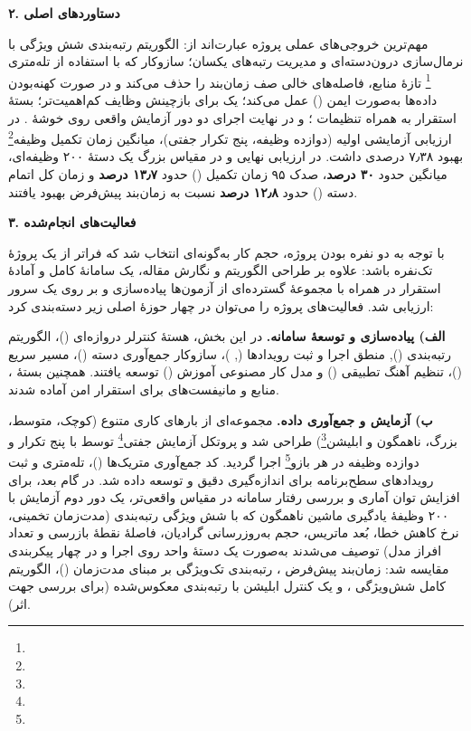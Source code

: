 \documentclass[a4paper,12pt]{article}
\begin{document}
	{\large\textbf{۲. دستاوردهای اصلی}}
	
	مهم‌ترین خروجی‌های عملی پروژه عبارت‌اند از: الگوریتم رتبه‌بندی شش‌ ویژگی با نرمال‌سازی درون‌دسته‌ای و مدیریت رتبه‌های یکسان؛ سازوکار  که با استفاده از تله‌متری \footnote{} تازهٔ منابع، فاصله‌های خالی صف زمان‌بند را حذف می‌کند و در صورت کهنه‌بودن داده‌ها به‌صورت ایمن () عمل می‌کند؛ یک  برای بازچینش وظایف کم‌اهمیت‌تر؛ بستهٔ استقرار  به همراه تنظیمات ؛ و در نهایت اجرای دو دور آزمایش واقعی روی خوشهٔ . در ارزیابی آزمایشی اولیه (دوازده وظیفه، پنج تکرار جفتی)، میانگین زمان تکمیل وظیفه\footnote{} بهبود ۷٫۳۸ درصدی داشت. در ارزیابی نهایی و در مقیاس بزرگ‌ یک دستهٔ ۲۰۰ وظیفه‌ای، میانگین  حدود \textbf{۳۰ درصد}، صدک ۹۵ زمان تکمیل () حدود \textbf{۱۳٫۷ درصد} و زمان کل اتمام دسته () حدود \textbf{۱۲٫۸ درصد} نسبت به زمان‌بند پیش‌فرض  بهبود یافتند.
	
	\vspace{0.2cm}
	
	{\large\textbf{۳. فعالیت‌های انجام‌شده}}
	
	با توجه به دو نفره بودن پروژه، حجم کار به‌گونه‌ای انتخاب شد که فراتر از یک پروژهٔ تک‌نفره باشد: علاوه بر طراحی الگوریتم و نگارش مقاله، یک سامانهٔ کامل و آمادهٔ استقرار در  همراه با مجموعهٔ گسترده‌ای از آزمون‌ها پیاده‌سازی و بر روی یک سرور ارزیابی شد. فعالیت‌های پروژه را می‌توان در چهار حوزهٔ اصلی زیر دسته‌بندی کرد:
	
	\textbf{الف) پیاده‌سازی و توسعهٔ سامانه.}
	در این بخش، هستهٔ کنترلر دروازه‌ای ()، الگوریتم رتبه‌بندی (), منطق اجرا و ثبت رویدادها (, )، سازوکار جمع‌آوری دسته ()، مسیر سریع ()، تنظیم آهنگ تطبیقی () و مدل کار مصنوعی آموزش () توسعه یافتند. همچنین بستهٔ ، منابع  و مانیفست‌های  برای استقرار امن آماده شدند.
	
	\textbf{ب) آزمایش و جمع‌آوری داده.}
	مجموعه‌ای از بارهای کاری متنوع (کوچک، متوسط، بزرگ، ناهمگون و ابلیشن\footnote{}) طراحی شد و پروتکل آزمایش جفتی\footnote{} توسط  با پنج تکرار و دوازده وظیفه در هر بازو\footnote{} اجرا گردید. کد جمع‌آوری متریک‌ها ()، تله‌متری و ثبت رویدادهای سطح‌برنامه برای اندازه‌گیری دقیق  و  توسعه داده شد. در گام بعد، برای افزایش توان آماری و بررسی رفتار سامانه در مقیاس واقعی‌تر، یک دور دوم آزمایش با ۲۰۰ وظیفهٔ یادگیری ماشین ناهمگون که با شش ویژگی رتبه‌بندی (مدت‌زمان تخمینی، نرخ کاهش خطا، بُعد ماتریس، حجم به‌روزرسانی گرادیان، فاصلهٔ نقطهٔ بازرسی و تعداد افراز مدل) توصیف می‌شدند به‌صورت یک دستهٔ واحد روی  اجرا و در چهار پیکربندی مقایسه شد: زمان‌بند پیش‌فرض ، رتبه‌بندی تک‌ویژگی بر مبنای مدت‌زمان ()، الگوریتم کامل شش‌ویژگی ، و یک کنترل ابلیشن با رتبه‌بندی معکوس‌شده (برای بررسی جهت اثر).
	
\end{document}
